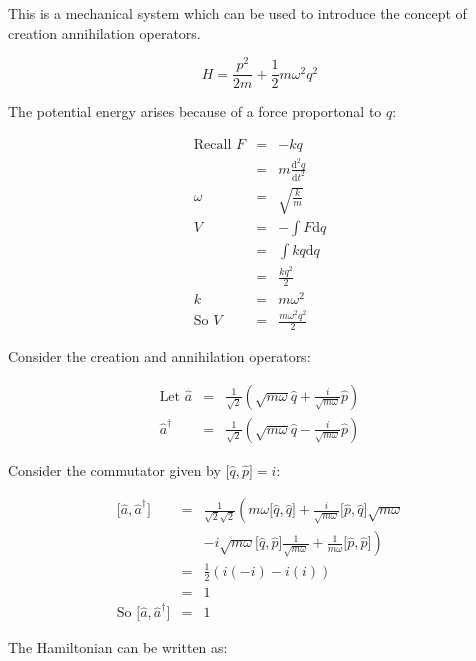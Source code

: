 This is a mechanical system which can be used to introduce the concept of creation annihilation operators.

\[
  H = \frac{p^2}{2m} + \frac{1}{2}m\omega^2q^2
\]

The potential energy arises because of a force proportonal to $q$:

\begin{eqnarray*}
  \textrm{Recall } F & = & -kq \\
  & = & m \frac{\mathrm{d}^2q}{\mathrm{d}t^2} \\
  \omega & = & \sqrt{\frac{k}{m}} \\
  V & = & -\int F \mathrm{d}q \\
  & = & \int kq \mathrm{d}q \\
  & = & \frac{kq^2}{2} \\
  k & = & m\omega^2 \\
  \textrm{So } V & = & \frac{m\omega^2q^2}{2}
\end{eqnarray*}

Consider the creation and annihilation operators:

\begin{eqnarray*}
  \textrm{Let } \hat{a} & = & \frac{1}{\sqrt{2}}\left(\sqrt{m\omega}\hat{q} + \frac{i}{\sqrt{m\omega}}\hat{p} \right) \\
  \hat{a}^{\dagger}     & = & \frac{1}{\sqrt{2}}\left(\sqrt{m\omega}\hat{q} - \frac{i}{\sqrt{m\omega}}\hat{p} \right)
\end{eqnarray*}

Consider the commutator given by $\lbrack \hat{q} , \hat{p} \rbrack = i$:

\begin{eqnarray*}
  \lbrack \hat{a} , \hat{a}^{\dagger} \rbrack
  & = & \frac{1}{\sqrt{2}\sqrt{2}}
        \left( m\omega \lbrack \hat{q},\hat{q} \rbrack
        + \frac{i}{\sqrt{m\omega}}\lbrack\hat{p},\hat{q}\rbrack\sqrt{m\omega} \right. \\
  &   & \left. - i\sqrt{m\omega}\lbrack\hat{q},\hat{p}\rbrack\frac{1}{\sqrt{m\omega}}
        + \frac{1}{m\omega}\lbrack\hat{p},\hat{p}\rbrack\right) \\
  & = & \frac{1}{2}\left(i(-i) - i (i) \right) \\
  & = & 1 \\
  \textrm{So } \lbrack \hat{a},\hat{a}^{\dagger}\rbrack & = & 1
\end{eqnarray*}

The Hamiltonian can be written as:


